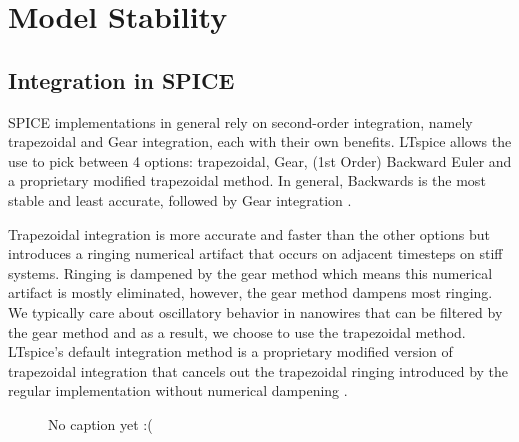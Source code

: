 \documentclass[]{article}
\begin{document}

\section{Model Stability} \label{stability}

\subsection{Integration in SPICE}

SPICE implementations in general rely on second-order integration, namely trapezoidal and Gear integration,
each with their own benefits. LTspice allows the use to pick between 4 options: trapezoidal,
Gear, (1st Order) Backward Euler and a proprietary modified trapezoidal method. In general,
Backwards is the most stable and least accurate, followed by Gear integration 
\cite{ltspice-diff-post, spice-book}.

Trapezoidal integration is more accurate and faster than the other options but introduces a ringing
numerical artifact that occurs on adjacent timesteps on stiff systems. Ringing is dampened by the gear
method which means this numerical artifact is mostly eliminated, however, the gear method dampens most
ringing. We typically care about oscillatory behavior in nanowires that can be filtered by the gear
method and as a result, we choose to use the trapezoidal method. LTspice's 
default integration method is a proprietary modified version of trapezoidal integration 
that cancels out the trapezoidal ringing introduced by the regular implementation without
numerical dampening \cite{ltspice-diff-post}. 

\begin{figure}
    \centering
    \caption{No caption yet :(}
    \label{fig:trapz_vs_gear}
\end{figure}
\end{document}
